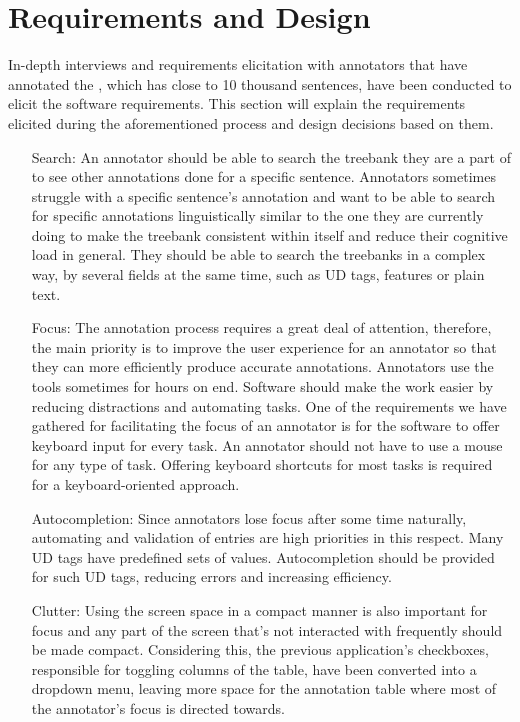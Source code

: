 \section{Requirements and Design}
\label{sec:requirements}

In-depth interviews and requirements elicitation with annotators that have annotated the \bountreebank{}, which has close to 10 thousand sentences, have been conducted to elicit the software requirements.
This section will explain the requirements elicited during the aforementioned process and design decisions based on them.

\begin{itemize}[before=\normalfont, font=\itshape, align=left]
\item[Search:]
An annotator should be able to search the treebank they are a part of to see other annotations done for a specific sentence.
Annotators sometimes struggle with a specific sentence's annotation and want to be able to search for specific annotations linguistically similar to the one they are currently doing to make the treebank consistent within itself and reduce their cognitive load in general.
They should be able to search the treebanks in a complex way, by several fields at the same time, such as UD tags, features or plain text.

\item[Focus:]
The annotation process requires a great deal of attention, therefore, the main priority is to improve the user experience for an annotator so that they can more efficiently produce accurate annotations.
Annotators use the tools sometimes for hours on end.
Software should make the work easier by reducing distractions and automating tasks.
One of the requirements we have gathered for facilitating the focus of an annotator is for the software to offer keyboard input for every task.
An annotator should not have to use a mouse for any type of task.
Offering keyboard shortcuts for most tasks is required for a keyboard-oriented approach.

\item[Autocompletion:]
Since annotators lose focus after some time naturally, automating and validation of entries are high priorities in this respect.
Many UD tags have predefined sets of values.
Autocompletion should be provided for such UD tags, reducing errors and increasing efficiency.

\item[Clutter:]
Using the screen space in a compact manner is also important for focus and any part of the screen that's not interacted with frequently should be made compact.
Considering this, the previous application's checkboxes, responsible for toggling columns of the table, have been converted into a dropdown menu, leaving more space for the annotation table where most of the annotator's focus is directed towards.


\end{itemize}
